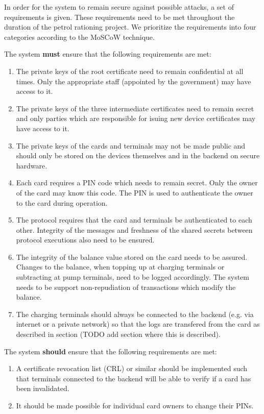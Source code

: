 In order for the system to remain secure against possible attacks, a set of requirements is given. These requirements need to be met throughout the duration of the petrol rationing project. We prioritize the requirements into four categories according to the MoSCoW technique.

The system {\bf must} ensure that the following requirements are met:
\begin{enumerate}
  \item The private keys of the root certificate need to remain confidential at all times. Only the appropriate staff (appointed by the government) may have access to it. 
  \item The private keys of the three intermediate certificates need to remain secret and only parties which are responsible for isuing new device certificates may have access to it.
  \item The private keys of the cards and terminals may not be made public and should only be stored on the devices themselves and in the backend on secure hardware.
  \item Each card requires a PIN code which needs to remain secret. Only the owner of the card may know this code. The PIN is used to authenticate the owner to the card during operation.
  \item The protocol requires that the card and terminals be authenticated to each other. Integrity of the messages and freshness of the shared secrets between protocol executions also need to be ensured.
  \item The integrity of the balance value stored on the card needs to be assured. Changes to the balance, when topping up at charging terminals or subtracting at pump terminals, need to be logged accordingly. The system needs to be support non-repudiation of transactions which modify the balance.
  \item The charging terminals should always be connected to the backend (e.g. via internet or a private network) so that the logs are transfered from the card as described in section (TODO add section where this is described).
\end{enumerate}

The system {\bf should} ensure that the following requirements are met:
\begin{enumerate}
  \item A certificate revocation list (CRL) or similar should be implemented such that terminals connected to the backend will be able to verify if a card has been invalidated.
  \item It should be made possible for individual card owners to change their PINs.
\end{enumerate}

